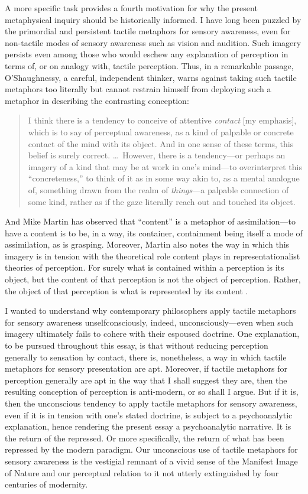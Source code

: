 A more specific task provides a fourth motivation for why the present metaphysical inquiry should be historically informed. I have long been puzzled by the primordial and persistent tactile metaphors for sensory awareness, even for non-tactile modes of sensory awareness such as vision and audition. Such imagery persists even among those who would eschew any explanation of perception in terms of, or on analogy with, tactile perception. Thus, in a remarkable passage, O'Shaughnessy, a careful, independent thinker, warns against taking such tactile metaphors too literally but cannot restrain himself from deploying such a metaphor in describing the contrasting conception:
\begin{quote}
	I think there is a tendency to conceive of attentive \emph{contact} [my emphasis], which is to say of perceptual awareness, as a kind of palpable or concrete contact of the mind with its object. And in one sense of these terms, this belief is surely correct. \ldots\ However, there is a tendency---or perhaps an imagery of a kind that may be at work in one's mind---to overinterpret this ``concreteness,'' to think of it as in some way akin to, as a mental analogue of, something drawn from the realm of \emph{things}---a palpable connection of some kind, rather as if the gaze literally reach out and touched its object. \citep[183]{OShaughnessy:2003eu}
\end{quote}
And Mike Martin has observed that ``content'' is a metaphor of assimilation---to have a content is to be, in a way, its container, containment being itself a mode of assimilation, as is grasping. Moreover, Martin also notes the way in which this imagery is in tension with the theoretical role content plays in representationalist theories of perception. For surely what is contained within a perception is its object, but the content of that perception is not the object of perception. Rather, the object of that perception is what is represented by its content \citep{Martin:1998nx}.

I wanted to understand why contemporary philosophers apply tactile metaphors for sensory awareness unselfconsciously, indeed, unconsciously---even when such imagery ultimately fails to cohere with their espoused doctrine. One explanation, to be pursued throughout this essay, is that without reducing perception generally to sensation by contact, there is, nonetheless, a way in which tactile metaphors for sensory presentation are apt. Moreover, if tactile metaphors for perception generally are apt in the way that I shall suggest they are, then the resulting conception of perception is anti-modern, or so shall I argue. But if it is, then the unconscious tendency to apply tactile metaphors for sensory awareness, even if it is in tension with one's stated doctrine, is subject to a psychoanalytic explanation, hence rendering the present essay a psychoanalytic narrative. It is the return of the repressed. Or more specifically, the return of what has been repressed by the modern paradigm. Our unconscious use of tactile metaphors for sensory awareness is the vestigial remnant of a vivid sense of the Manifest Image of Nature and our perceptual relation to it not utterly extinguished by four centuries of modernity.

